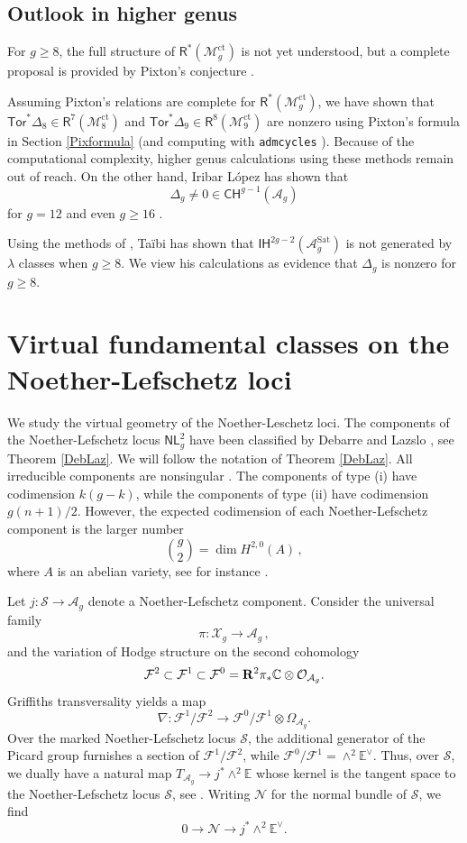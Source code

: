 \documentclass[11pt]{amsart}
\theoremstyle{definition}
\newcommand{\M}{\mathcal{M}}
\newcommand{\A}{\mathcal{A}}
\DeclareMathOperator{\ct}{ct}
\newcommand{\Tor}{\mathsf{Tor}}
\begin{document}
{ 

\subsection{Outlook in higher genus}
For $g\geq 8$, the full structure of $\mathsf{R}^*(\M_g^{\ct})$ is not yet understood,
but a complete proposal is provided by  Pixton's conjecture \cite{Pix}.


Assuming  Pixton's relations are complete for $\mathsf{R}^*(\M_g^{\ct})$, we have shown that  $\Tor^*\Delta_8\in \mathsf{R}^7(\M_8^{\ct})$ and 
$\Tor^*\Delta_9\in \mathsf{R}^8(\M_9^{\ct})$ are nonzero using Pixton's formula in Section \ref{Pixformula}
(and computing with
\texttt{admcycles} \cite{admcycles}). 
Because of the computational complexity, higher genus calculations using these methods remain out of reach.  On the other hand, Iribar López has shown that $$\Delta_g\neq 0\in \mathsf{CH}^{g-1}(\A_g)$$ for $g=12$ and even $g\geq 16$ \cite{Iribar}. 

Using the methods of \cite[Theorem 33]{HT2}, Taïbi has shown that $\mathsf{IH}^{2g-2}(\A_g^{\mathrm{Sat}})$ is not generated by $\lambda$ classes when $g\geq 8$. We view his calculations as evidence that $\Delta_g$ is nonzero for $g\geq 8$.
 
\section{Virtual fundamental classes on the Noether-Lefschetz loci}\label{virtual}
We study the virtual geometry of the Noether-Leschetz loci. The components of the Noether-Lefschetz locus 
$\mathsf {NL}_g^2$ have been classified by Debarre and Lazslo \cite{DL}, see Theorem \ref{DebLaz}. 
We will follow the notation of
Theorem \ref{DebLaz}.
All irreducible components are nonsingular \cite {DL}. The components of type (i)  have codimension $k(g-k)$, while the components of type (ii) have codimension $g(n+1)/2$. However, the expected codimension of each Noether-Lefschetz component is the larger number
$$\binom{g}{2}=\dim H^{2, 0}(A)\, ,$$ where $A$ is an abelian variety, see for instance \cite [3.a.25]{CGGH}. 

Let $j:\mathcal S\to \A_g$ denote a Noether-Lefschetz component. Consider the universal family $$\pi: \mathcal X_g\to \A_g\,,$$ and the variation of Hodge structure on the second cohomology $$\mathcal F^2\subset \mathcal F^1\subset \mathcal F^0={\bf R}^2\pi_{*} \mathbb C\otimes \mathcal O_{\A_g}.$$ Griffiths transversality yields a map $$\nabla: \mathcal F^1/\mathcal F^2\to \mathcal F^0/\mathcal F^1 \otimes \Omega_{\A_g}.$$ Over the marked Noether-Lefschetz locus $\mathcal S$, the additional generator of the Picard group furnishes a section of $\mathcal F^1/\mathcal F^2$, while $\mathcal F^0/\mathcal F^1=\wedge^2 \mathbb E^{\vee}.$ Thus, over $\mathcal S$, we dually have a natural map $T_{\A_g}\to j^{*} \wedge^2 \mathbb E$ whose kernel is the tangent space to the Noether-Lefschetz locus $\mathcal S$, see \cite [Lemma 5.16]{V}. Writing $\mathcal N$ for the normal bundle of $\mathcal S
$, we find $$0\to \mathcal N\to j^*\wedge^2 \mathbb E^{\vee}.$$ 

}
\end{document}
